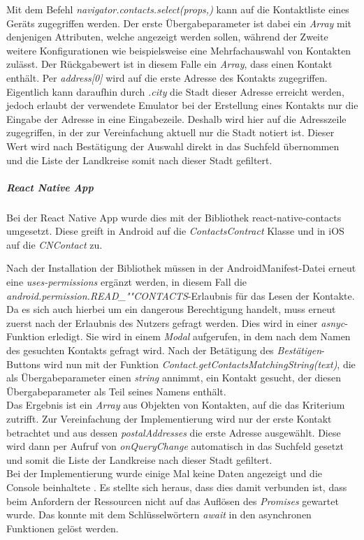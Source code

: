 Mit dem Befehl \textit{navigator.contacts.select(props,{})} kann auf die Kontaktliste eines Geräts zugegriffen werden.
Der erste Übergabeparameter ist dabei ein \textit{Array} mit denjenigen Attributen, welche angezeigt werden sollen, während der Zweite weitere Konfigurationen wie beispielsweise eine Mehrfachauswahl von Kontakten zulässt.
Der Rückgabewert ist in diesem Falle ein \textit{Array}, dass einen Kontakt enthält.
Per \textit{address[0]} wird auf die erste Adresse des Kontakts zugegriffen.
Eigentlich kann daraufhin durch \textit{.city} die Stadt dieser Adresse erreicht werden, jedoch erlaubt der verwendete Emulator bei der Erstellung eines Kontakts nur die Eingabe der Adresse in eine Eingabezeile.
Deshalb wird hier auf die Adresszeile zugegriffen, in der zur Vereinfachung aktuell nur die Stadt notiert ist.
Dieser Wert wird nach Bestätigung der Auswahl direkt in das Suchfeld übernommen und die Liste der Landkreise somit nach dieser Stadt gefiltert.

\subparagraph{React Native App\\}
Bei der React Native App wurde dies mit der Bibliothek \glqq react-native-contacts\grqq{} umgesetzt.
Diese greift in Android auf die \textit{ContactsContract} Klasse und in iOS auf die \textit{CNContact} zu.

Nach der Installation der Bibliothek müssen in der AndroidManifest-Datei erneut eine \textit{uses-permissions} ergänzt werden, in diesem Fall die \textit{android.permission.READ\_""CONTACTS}-Erlaubnis für das Lesen der Kontakte.
Da es sich auch hierbei um ein \glqq dangerous\grqq{} Berechtigung handelt, muss erneut zuerst nach der Erlaubnis des Nutzers gefragt werden.
Dies wird in einer \textit{asnyc}-Funktion erledigt.
Sie wird in einem \textit{Modal} aufgerufen, in dem nach dem Namen des gesuchten Kontakts gefragt wird.
Nach der Betätigung des \textit{Bestätigen}-Buttons wird nun mit der Funktion \textit{Contact.getContactsMatchingString(text)}, die als Übergabeparameter einen \textit{string} annimmt, ein Kontakt gesucht, der diesen Übergabeparameter als Teil seines Namens enthält.\\
Das Ergebnis ist ein \textit{Array} aus Objekten von Kontakten, auf die das Kriterium zutrifft.
Zur Vereinfachung der Implementierung wird nur der erste Kontakt betrachtet und aus dessen \textit{postalAddresses} die erste Adresse ausgewählt.
Diese wird dann per Aufruf von \textit{onQueryChange} automatisch in das Suchfeld gesetzt und somit die Liste der Landkreise nach dieser Stadt gefiltert.\\
Bei der Implementierung wurde einige Mal keine Daten angezeigt und die Console beinhaltete \grqq{}.
Es stellte sich heraus, dass dies damit verbunden ist, dass beim Anfordern der Ressourcen nicht auf das Auflösen des \textit{Promises} gewartet wurde.
Das konnte mit dem Schlüsselwörtern \textit{await} in den asynchronen Funktionen gelöst werden.

